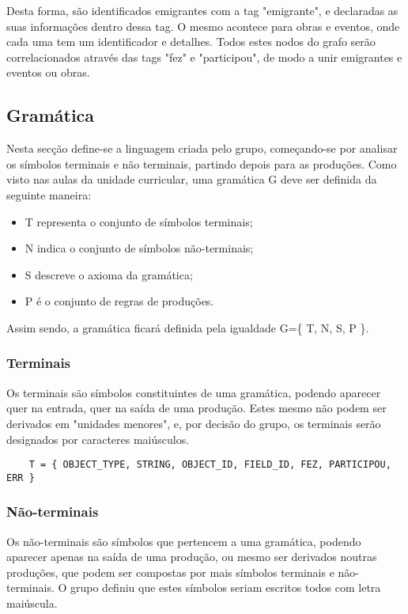 \documentclass[a4paper]{article}
\begin{document}
\bigskip

\par Desta forma, são identificados emigrantes com a tag "emigrante", e declaradas as suas informações dentro dessa tag. O mesmo acontece para obras e eventos, onde cada uma tem um identificador e detalhes. Todos estes nodos do grafo serão correlacionados através das tags "fez" e "participou", de modo a unir emigrantes e eventos ou obras.


\subsection{Gramática}
\label{sec:3.2}
\hspace{3.5mm} Nesta secção define-se a linguagem criada pelo grupo, começando-se por analisar os símbolos terminais e não terminais, partindo depois para as produções. Como visto nas aulas da unidade curricular, uma gramática G deve ser definida da seguinte maneira:

\begin{itemize}
    \item T representa o conjunto de símbolos terminais; 
    \item N indica o conjunto de símbolos não-terminais;
    \item S descreve o axioma da gramática;
    \item P é o conjunto de regras de produções.
\end{itemize}

\par Assim sendo, a gramática ficará definida pela igualdade G=\{ T, N, S, P \}.
\bigskip

\subsubsection{Terminais}
\label{sec:3.2.1}
\hspace{3.5mm} Os terminais são símbolos constituintes de uma gramática, podendo aparecer quer na entrada, quer na saída de uma produção. Estes mesmo não podem ser derivados em "unidades menores", e, por decisão do grupo, os terminais serão designados por caracteres maiúsculos.

\bigskip
\begin{lstlisting}
    T = { OBJECT_TYPE, STRING, OBJECT_ID, FIELD_ID, FEZ, PARTICIPOU, ERR }
\end{lstlisting}


\subsubsection{Não-terminais}
\label{sec:3.2.2}
\hspace{3.5mm} Os não-terminais são símbolos que pertencem a uma gramática, podendo aparecer apenas na saída de uma produção, ou mesmo ser derivados noutras produções, que podem ser compostas por mais símbolos terminais e não-terminais. O grupo definiu que estes símbolos seriam escritos todos com letra maiúscula.
\end{document}
